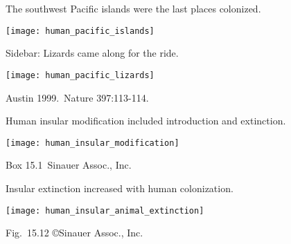 \documentclass[t]{beamer}
\begin{document}
%
\begin{frame}{The southwest Pacific islands were the last places colonized.}
	\vspace{-\baselineskip}
	\begin{center}
		\texttt{[image: human\_pacific\_islands]}
	\end{center}
\end{frame}
%
\begin{frame}{Sidebar: Lizards came along for the ride.}
	\vspace{-\baselineskip}
	\begin{center}
		\texttt{[image: human\_pacific\_lizards]}
	\end{center}

	\hfill \tiny Austin 1999.~Nature 397:113-114.
\end{frame}
%
\begin{frame}{Human insular modification included introduction and extinction.}
	\vspace{-0.5\baselineskip}
	\begin{center}
		\texttt{[image: human\_insular\_modification]}
	\end{center}
	
	\tinyfill Box 15.1~\textcopyright Sinauer Assoc., Inc.
	
\end{frame}
%
\begin{frame}{Insular extinction increased with human colonization.}
	\vspace{-0.5\baselineskip}
	\begin{center}
		\texttt{[image: human\_insular\_animal\_extinction]}
	\end{center}
	
	\tinyfill Fig.~15.12 \copyright Sinauer Assoc., Inc.
	
\end{frame}
\end{document}
